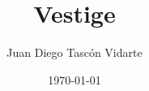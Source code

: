 \documentclass{beamer}
\title{Vestige}
\author{Juan Diego Tascón Vidarte}
\institute{Konkuk University \\ HCI Lab}
\date{\today{}}
\begin{document}
\begin{frame}
	\titlepage
\end{frame}

\begin{frame}{}
	\tableofcontents
\end{frame}





\nocite{*}
\end{document}
